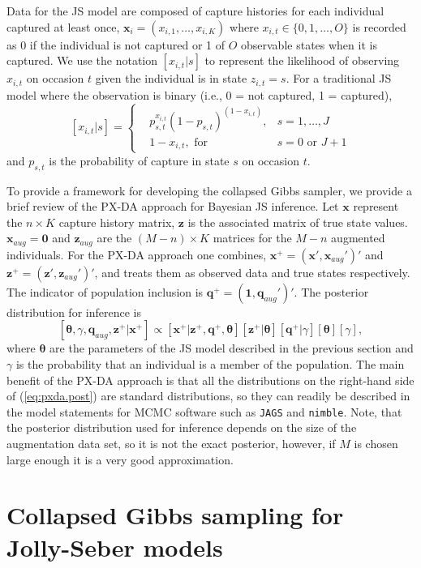 \documentclass[11pt]{article}
\newcommand{\bx}{\ensuremath{\mathbf{x}}}
\newcommand{\bz}{\ensuremath{\mathbf{z}}}
\newcommand{\bt}{\ensuremath{\boldsymbol{\theta}}}
\newcommand{\bq}{\ensuremath{\mathbf{q}}}
\begin{document}
Data for the JS model are composed of capture histories for each individual captured at least once, $\bx_i = (x_{i,1},\dots,x_{i,K})$ where $x_{i,t} \in \{0,1,\dots,O\}$ is recorded as 0 if the individual is not captured or 1 of $O$ observable states when it is captured. We use the notation $[x_{i,t}|s]$ to represent the likelihood of observing $x_{i,t}$ on occasion $t$ given the individual is in state $z_{i,t} = s$. For a traditional JS model where the observation is binary (i.e., 0 = not captured, 1 = captured), 
\[
[x_{i,t}|s] = \left\{
\begin{array}{rll}
& p_{s,t}^{x_{i,t}}(1-p_{s,t})^{(1-x_{i,t})},&s=1,\dots,J\\
& 1-x_{i,t},\text{ for }& s=0 \text{ or } J+1
\end{array} \right.
\]      
and $p_{s,t}$ is the probability of capture in state $s$ on occasion $t$.

To provide a framework for developing the collapsed Gibbs sampler, we provide a brief review of the PX-DA approach for Bayesian JS inference. Let $\bx$ represent the $n\times K$ capture history matrix, $\bz$ is the associated matrix of true state values. $\bx_{aug} = \mathbf{0}$ and $\bz_{aug}$ are the $(M-n) \times K$ matrices for the $M-n$ augmented individuals. For the PX-DA approach one combines, $\bx^+ = (\bx',\bx_{aug}')'$ and $\bz^+ = (\bz',\bz_{aug}')'$, and treats them as observed data and true states respectively. The indicator of population inclusion is $\bq^+ = (\mathbf{1},\bq_{aug}')'$. The posterior distribution for inference is
\begin{equation}
\label{eq:pxda.post}
[\bt,\gamma, \bq_{aug}, \bz^+|\bx^+] \propto [\bx^+|\bz^+,\bq^+,\bt][\bz^+|\bt][\bq^+|\gamma][\bt][\gamma],
\end{equation}
where $\bt$ are the parameters of the JS model described in the previous section and $\gamma$ is the probability that an individual is a member of the population. The main benefit of the PX-DA approach is that all the distributions on the right-hand side of (\ref{eq:pxda.post}) are standard distributions, so they can readily be described in the model statements for MCMC software such as {\tt JAGS} and {\tt nimble}. Note, that the posterior distribution used for inference depends on the size of the augmentation data set, so it is not the exact posterior, however, if $M$ is chosen large enough it is a very good approximation. 

\section{Collapsed Gibbs sampling for Jolly-Seber models}
\end{document}
